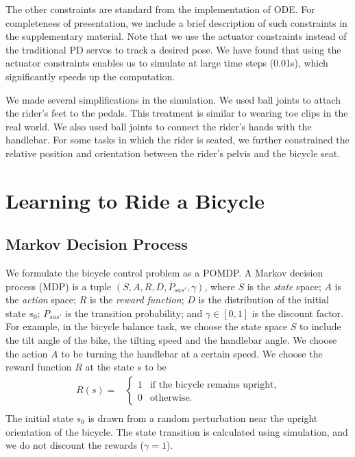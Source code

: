 The other constraints are standard from the implementation of ODE. For completeness of presentation, we include a brief description of such constraints in the supplementary material. Note that we use the actuator constraints instead of the traditional PD servos to track a desired pose. We have found that using the actuator constraints enables us to simulate at large time steps (0.01s), which significantly speeds up the computation.

We made several simplifications in the simulation. We used ball joints to attach the rider's feet to the pedals. This treatment is similar to wearing toe clips in the real world. We also used ball joints to connect the rider's hands with the handlebar. For some tasks in which the rider is seated, we further constrained the relative position and orientation between the rider's pelvis and the bicycle seat.


\section{Learning to Ride a Bicycle}
\label{sec:control}

\subsection{Markov Decision Process}
We formulate the bicycle control problem as a POMDP. A Markov decision process (MDP) is a tuple $(S, A, R, D, P_{sas'}, \gamma)$, where $S$ is the \emph{state} space; $A$ is the \emph{action} space; $R$ is the \emph{reward function}; $D$ is the distribution of the initial state $s_0$; $P_{sas'}$ is the transition probability; and $\gamma \in [0, 1]$ is the discount factor. For example, in the bicycle balance task, we choose the state space $S$ to include the tilt angle of the bike, the tilting speed and the handlebar angle. We choose the action $A$ to be turning the handlebar at a certain speed. We choose the reward function $R$ at the state $s$ to be
\begin{equation}
\begin{array}{ll}
R(s) = & \left\{ \begin{array}{ll}
1 & \textrm{if the bicycle remains upright,}\\
0 & \textrm{otherwise.}
\end{array} \right. \\
\end{array}
\label{eq:balanceReward}
\end{equation}
The initial state $s_0$ is drawn from a random perturbation near the upright orientation of the bicycle. The state transition is calculated using simulation, and we do not discount the rewards ($\gamma = 1$).

